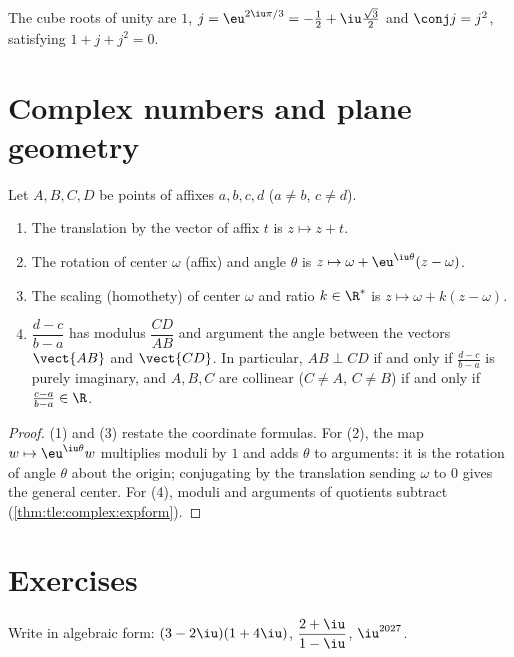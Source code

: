 \begin{example}
The cube roots of unity are $1$, $j = \eu^{2\iu\pi/3} =
-\frac12 + \iu\frac{\sqrt3}{2}$ and $\conj j = j^2$, satisfying
$1 + j + j^2 = 0$.
\end{example}

\section{Complex numbers and plane geometry}

\begin{proposition}\label{prop:tle:complex:geometry}
Let $A, B, C, D$ be points of affixes $a, b, c, d$ ($a \neq b$,
$c \neq d$).
\begin{enumerate}
  \item The translation by the vector of affix $t$ is $z \mapsto z + t$.
  \item The rotation of center $\omega$ (affix) and angle $\theta$ is
        $z \mapsto \omega + \eu^{\iu\theta}(z - \omega)$.
  \item The scaling (homothety) of center $\omega$ and ratio
        $k \in \R^*$ is $z \mapsto \omega + k(z - \omega)$.
  \item $\dfrac{d - c}{b - a}$ has modulus $\dfrac{CD}{AB}$ and argument the
        angle between the vectors $\vect{AB}$ and $\vect{CD}$. In
        particular, $AB \perp CD$ if and only if $\frac{d-c}{b-a}$ is purely
        imaginary, and $A, B, C$ are collinear ($C \ne A$, $C\ne B$) if and
        only if $\frac{c-a}{b-a} \in \R$.
\end{enumerate}
\end{proposition}

\begin{proof}
(1) and (3) restate the coordinate formulas. For (2), the map
$w \mapsto \eu^{\iu\theta} w$ multiplies moduli by $1$ and adds $\theta$ to
arguments: it is the rotation of angle $\theta$ about the origin; conjugating
by the translation sending $\omega$ to $0$ gives the general center. For
(4), moduli and arguments of quotients subtract
(\cref{thm:tle:complex:expform}).
\end{proof}

\section{Exercises}

\begin{exercise}[$\star$]\label{exo:tle:complex:1}
Write in algebraic form:
$(3 - 2\iu)(1 + 4\iu)$, \quad $\dfrac{2 + \iu}{1 - \iu}$, \quad
$\iu^{2027}$.
\end{exercise}

